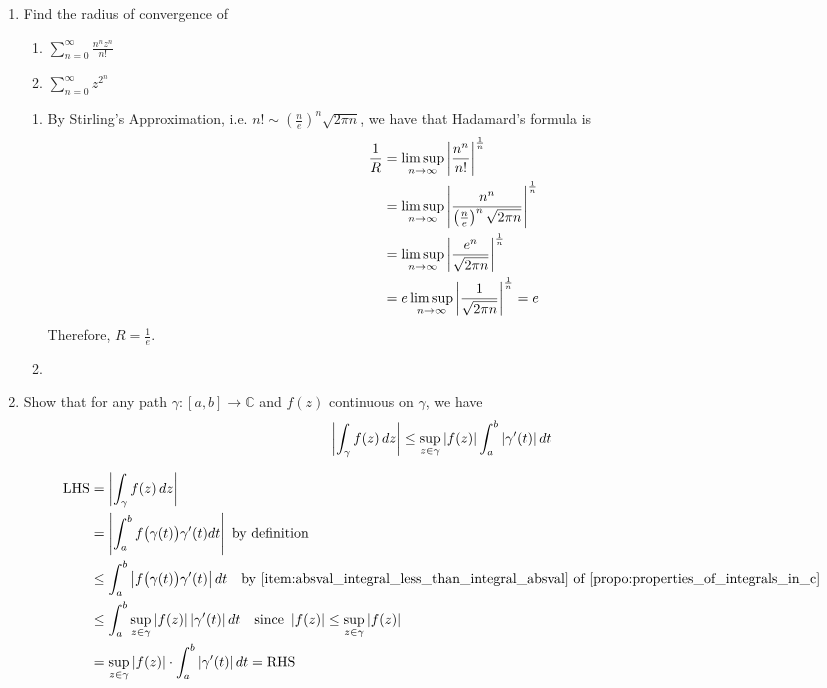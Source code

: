 \documentclass[notoc,notitlepage]{tufte-book}
\begin{document}
\begin{enumerate}
	\item Find the radius of convergence of
		\begin{enumerate}
			\item $\sum_{n=0}^{\infty} \frac{n^n z^n}{n!}$
			\item $\sum_{n=0}^{\infty} z^{2^n}$
		\end{enumerate}

		\begin{solution}
			\begin{enumerate}
				\item By Stirling's Approximation, i.e. $n! \sim (\frac{n}{e})^n \sqrt{2 \pi n}$, we have that Hadamard's formula is
					\begin{align*}
						\frac{1}{R} &= \limsup_{n \to \infty} \left|\frac{n^n}{n!}\right|^\frac{1}{n} \\
							&= \limsup_{n \to \infty} \left|\frac{n^n}{\left(\frac{n}{e} \right)^n \sqrt{2 \pi n}}\right|^\frac{1}{n} \\
							&= \limsup_{n \to \infty} \left|\frac{e^n}{\sqrt{2 \pi n}} \right|^\frac{1}{n} \\
							&= e \limsup_{n \to \infty} \left|\frac{1}{\sqrt{2 \pi n}} \right|^\frac{1}{n} = e
					\end{align*}
					Therefore, $R = \frac{1}{e}$.

					\item {}
			\end{enumerate}
		\end{solution}
	\item Show that for any path $\gamma: [a, b] \to \mathbb{C}$ and $f(z)$ continuous on $\gamma$, we have
		\begin{equation*}
			\left|\int_{\gamma} f(z) \mathop{}\!d{z}\right| \leq \sup_{z \in \gamma} \left|f(z)\right| \int_{a}^{b} \left|\gamma'(t)\right| dt
		\end{equation*}

		\begin{solution}
			\begin{align*}
				\text{LHS} &= \abs{\int_{\gamma} f(z) \dif{z}} \\
					&= \abs{\int_{a}^{b} f\big( \gamma(t) \big) \gamma'(t) dt} \text{ by definition} \\
					&\leq \int_{a}^{b} \abs{f\big( \gamma(t) \big) \gamma'(t)} dt \quad \text{by } \cref{item:absval_integral_less_than_integral_absval} \text{ of } \cref{propo:properties_of_integrals_in_c} \\
					&\leq \int_{a}^{b} \sup_{z \in \gamma} \abs{f(z)} \abs{\gamma'(t)} dt \quad \text{since } \abs{f(z)} \leq \sup_{z \in \gamma} \abs{f(z)} \\
					&= \sup_{z \in \gamma} \abs{f(z)} \cdot \int_{a}^{b} \abs{\gamma'(t)} dt = \text{RHS}
			\end{align*}
		\end{solution}
\end{enumerate}
\end{document}
